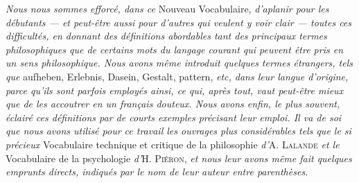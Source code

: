 {\it Nous nous sommes efforcé, dans ce} Nouveau Vocabulaire, {\it d'aplanir pour
les débutants — et peut-être aussi pour d’autres qui veulent y voir clair — toutes
ces difficultés, en donnant des définitions abordables tant des principaux
termes philosophiques que de certains mots du langage courant qui peuvent
être pris en un sens philosophique. Nous avons même introduit quelques
termes étrangers, tels que} aufheben, Erlebnis, Dasein, Gestalt, pattern, {\it etc,
dans leur langue d’origine, parce qu’ils sont parfois employés ainsi, ce qui,
après tout, vaut peut-être mieux que de les accoutrer en un français douteux.
Nous avons enfin, le plus souvent, éclairé ces définitions par de courts exemples
précisant leur emploi. Il va de soi que nous avons utilisé pour ce travail les
ouvrages plus considérables tels que le si précieux } Vocabulaire technique
et critique de la philosophie {\it d'}A. \textsc{Lalande} {\it et le} Vocabulaire de la psychologie
{\it d'}H. \textsc{Piéron}, {\it et nous leur avons même fait quelques emprunts directs,
indiqués par le nom de leur auteur entre parenthèses.}

